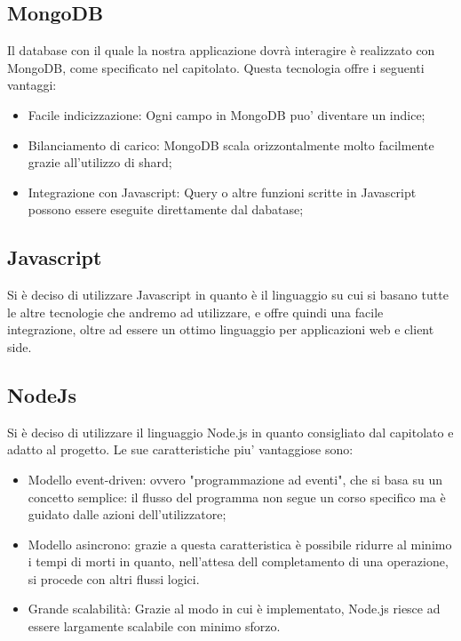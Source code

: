 \subsection{MongoDB}
Il database con il quale la nostra applicazione dovrà interagire è realizzato con MongoDB, come specificato nel capitolato. Questa tecnologia offre i seguenti vantaggi:
\begin{itemize}
\item Facile indicizzazione: Ogni campo in MongoDB puo' diventare un indice;
\item Bilanciamento di carico: MongoDB scala orizzontalmente molto facilmente grazie all'utilizzo di shard;
\item Integrazione con Javascript: Query o altre funzioni scritte in Javascript possono essere eseguite direttamente dal dabatase;
\end{itemize}

\subsection{Javascript}
Si è deciso di utilizzare Javascript in quanto è il linguaggio su cui si basano tutte le altre tecnologie che andremo ad utilizzare, e offre quindi una facile integrazione, oltre ad essere un ottimo linguaggio per applicazioni web e client side.


\subsection{NodeJs}
Si è deciso di utilizzare il linguaggio Node.js in quanto consigliato dal capitolato e adatto al progetto. Le sue caratteristiche piu' vantaggiose sono:
\begin{itemize}
\item Modello event-driven: ovvero "programmazione ad eventi", che si basa su un concetto semplice: il flusso del programma non segue un corso specifico ma è guidato dalle azioni dell'utilizzatore;
\item Modello asincrono: grazie a questa caratteristica è possibile ridurre al minimo i tempi di morti in quanto, nell’attesa dell completamento di una operazione, si procede con altri flussi logici. 
\item Grande scalabilità: Grazie al modo in cui è implementato, Node.js riesce ad essere largamente scalabile con minimo sforzo.
\end{itemize}

